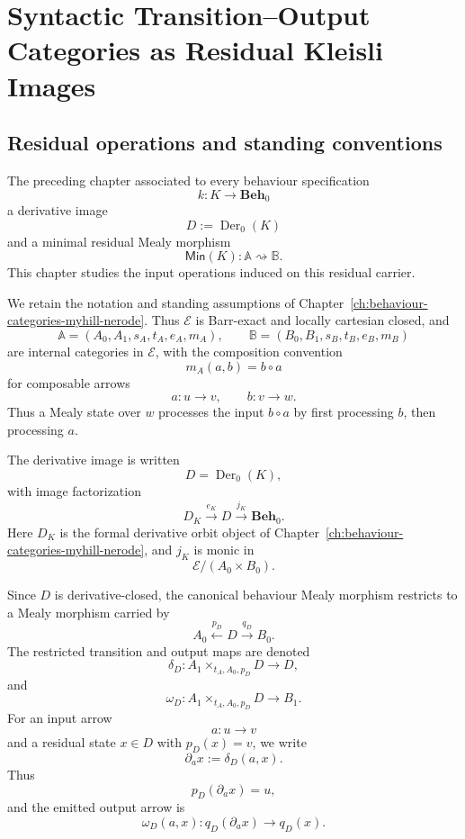 \chapter{Syntactic Transition--Output Categories as Residual Kleisli Images}
\label{ch:syntactic-transition-output-categories}

\section{Residual operations and standing conventions}
\label{sec:syn-to-standing-conventions}

The preceding chapter associated to every behaviour specification
\[
    k:K\to\mathbf{Beh}_0
\]
a derivative image
\[
    D:=\operatorname{Der}_0(K)
\]
and a minimal residual Mealy morphism
\[
    \mathsf{Min}(K):\mathbb A\rightsquigarrow\mathbb B .
\]
This chapter studies the input operations induced on this residual carrier.

We retain the notation and standing assumptions of
Chapter~\ref{ch:behaviour-categories-myhill-nerode}. Thus \(\mathcal E\) is
Barr-exact and locally cartesian closed, and
\[
    \mathbb A=(A_0,A_1,s_A,t_A,e_A,m_A),
    \qquad
    \mathbb B=(B_0,B_1,s_B,t_B,e_B,m_B)
\]
are internal categories in \(\mathcal E\), with the composition convention
\[
    m_A(a,b)=b\circ a
\]
for composable arrows
\[
    a:u\to v,
    \qquad
    b:v\to w.
\]
Thus a Mealy state over \(w\) processes the input \(b\circ a\) by first
processing \(b\), then processing \(a\).

The derivative image is written
\[
    D=\operatorname{Der}_0(K),
\]
with image factorization
\[
    D_K
        \xrightarrow{e_K}
    D
        \xrightarrow{j_K}
    \mathbf{Beh}_0.
\]
Here \(D_K\) is the formal derivative orbit object of
Chapter~\ref{ch:behaviour-categories-myhill-nerode}, and \(j_K\) is monic in
\[
    \mathcal E/(A_0\times B_0).
\]

Since \(D\) is derivative-closed, the canonical behaviour Mealy morphism
restricts to a Mealy morphism carried by
\[
    A_0
    \xleftarrow{p_D}
    D
    \xrightarrow{q_D}
    B_0 .
\]
The restricted transition and output maps are denoted
\[
    \delta_D:
    A_1\times_{t_A,A_0,p_D}D\to D,
\]
and
\[
    \omega_D:
    A_1\times_{t_A,A_0,p_D}D\to B_1.
\]
For an input arrow
\[
    a:u\to v
\]
and a residual state \(x\in D\) with \(p_D(x)=v\), we write
\[
    \partial_a x:=\delta_D(a,x).
\]
Thus
\[
    p_D(\partial_a x)=u,
\]
and the emitted output arrow is
\[
    \omega_D(a,x):q_D(\partial_a x)\to q_D(x).
\]

